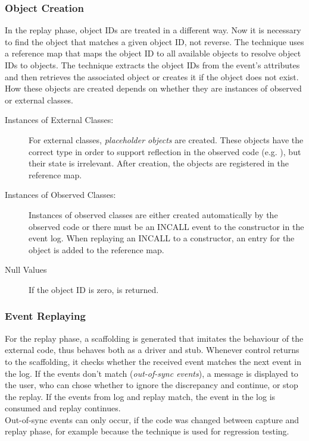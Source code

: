 \subsubsection{Object Creation}
In the replay phase, object IDs are treated in a different way. Now it is necessary to find the object that matches a given object ID, not reverse. The technique uses a reference map that maps the object ID to all available  objects to resolve object IDs to objects. The technique extracts the object IDs from the event's attributes and then retrieves the associated object or creates it if the object does not exist. How these objects are created depends on whether they are instances of observed or external classes.
\begin{description}
 \item [Instances of External Classes:] For external classes, \emph{placeholder objects} are created. These objects have the correct type in order to support reflection in the observed code (e.g. ), but their state is irrelevant. After creation, the objects are registered in the reference map.
 \item [Instances of Observed Classes:] Instances of observed classes are either created automatically by the observed code or there must be an INCALL event to the constructor in the event log. When replaying an INCALL to a constructor, an entry for the object is added to the reference map.
 \item [Null Values] If the object ID is zero,  is returned.
\end{description}

\subsubsection{Event Replaying}
For the replay phase, a scaffolding is generated that imitates the behaviour of the external code, thus behaves both as a driver and stub. Whenever control returns to the scaffolding, it checks whether the received event matches the next event in the log. If the events don't match (\emph{out-of-sync events}), a message is displayed to the user, who can chose whether to ignore the discrepancy and continue, or stop the replay. If the events from log and replay match, the event in the log is  consumed and replay continues. \\
Out-of-sync events can only occur, if the code was changed between capture and replay phase, for example because the technique is used for regression testing. 

